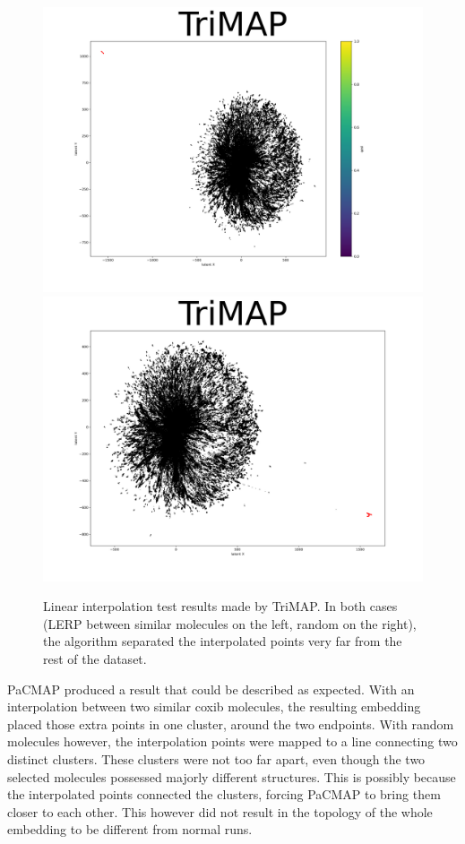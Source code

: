 \begin{figure}[h]
	\centering
	\includegraphics[width=0.7\columnwidth]{figures/TriMAP_LERP_coxib}
	\includegraphics[width=0.7\columnwidth]{figures/TriMAP_LERP_random}
	\caption{Linear interpolation test results made by TriMAP. In both cases (LERP between similar molecules on the left, random on the right), the algorithm separated the interpolated points very far from the rest of the dataset.}
	\label{fig:trimap:lerp}
\end{figure}

PaCMAP produced a result that could be described as expected. With an interpolation between two similar coxib molecules, the resulting embedding placed those extra points in one cluster, around the two endpoints. With random molecules however, the interpolation points were mapped to a line connecting two distinct clusters. These clusters were not too far apart, even though the two selected molecules possessed majorly different structures. This is possibly because the interpolated points connected the clusters, forcing PaCMAP to bring them closer to each other. This however did not result in the topology of the whole embedding to be different from normal runs. 

